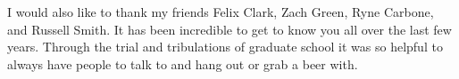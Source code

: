 I would also like to thank my friends Felix Clark, Zach Green, Ryne Carbone, and Russell Smith.  It has been incredible to get to know you all over the last few years.  Through the trial and tribulations of graduate school it was so helpful to always have people to talk to and hang out or grab a beer with.  














